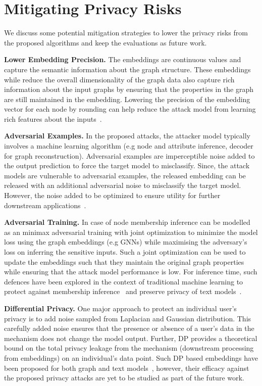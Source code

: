 \section{Mitigating Privacy Risks}\label{discuss}

We discuss some potential mitigation strategies to lower the privacy risks from the proposed algorithms and keep the evaluations as future work.

\noindent\textbf{Lower Embedding Precision.} The embeddings are continuous values and capture the semantic information about the graph structure.
These embeddings while reduce the overall dimensionality of the graph data also capture rich information about the input graphs by ensuring that the properties in the graph are still maintained in the embedding.
Lowering the precision of the embedding vector for each node by rounding can help reduce the attack model from learning rich features about the inputs~\cite{membershipinf,nlp}.

\noindent\textbf{Adversarial Examples.} In the proposed attacks, the attacker model typically involves a machine learning algorithm (e.g node and attribute inference, decoder for graph reconstruction).
Adversarial examples are imperceptible noise added to the output prediction to force the target model to misclassify.
Since, the attack models are vulnerable to adversarial examples, the released embedding can be released with an additional adversarial noise to misclassify the target model.
However, the noise added to be optimized to ensure utility for further downstream applications~\cite{attriguard,memguard}.

\noindent\textbf{Adversarial Training.} In case of node membership inference can be modelled as an minimax adversarial training with joint optimization to minimize the model loss using the graph embeddings (e.g GNNs) while maximising the adversary's loss on inferring the sensitive inputs.
Such a joint optimization can be used to update the embeddings such that they maintain the original graph properties while ensuring that the attack model performance is low.
For inference time, such defences have been explored in the context of traditional machine learning to protect against membership inference~\cite{advreg} and preserve privacy of text models~\cite{textembleak}.

\noindent\textbf{Differential Privacy.} One major approach to protect an individual user's privacy is to add noise sampled from Laplacian and Gaussian distribution.
This carefully added noise ensures that the presence or absence of a user's data in the mechanism does not change the model output.
Further, DP provides a theoretical bound on the total privacy leakage from the mechanism (downstream processing from embeddings) on an individual's data point.
Such DP based embeddings have been proposed for both graph and text models~\cite{dptext,dpne}, however, their efficacy against the proposed privacy attacks are yet to be studied as part of the future work.
